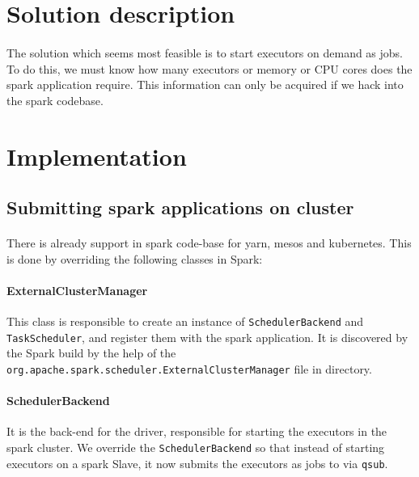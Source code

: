 \section{Solution description}

\paragraph{}
The solution which seems most feasible is to start \glspl{executor} on
demand as  jobs. To do this, we must know how many executors or
memory or CPU cores does the spark application require. This information can
only be acquired if we hack into the \gls{spark} codebase.



\section{Implementation}

\subsection{Submitting \gls{spark} applications on  cluster}

\paragraph{} There is already support in \gls{spark} code-base for \gls{yarn},
\gls{mesos} and \gls{kubernetes}. This is done by overriding the following
classes in Spark:

\paragraph{ExternalClusterManager} This class is responsible to create an
instance of \texttt{SchedulerBackend} and \texttt{TaskScheduler}, and register
them with the \gls{spark} application. It is discovered by the Spark build by
the help of the \texttt{org.apache.spark.scheduler.ExternalClusterManager} file
in 
directory.

\paragraph{SchedulerBackend} It is the back-end for the \gls{driver},
responsible for starting the \glspl{executor} in the \gls{spark} cluster. We
override the \texttt{SchedulerBackend} so that instead of starting
\glspl{executor} on a \gls{spark} Slave, it now submits the \glspl{executor} as
jobs to  via \texttt{qsub}.

